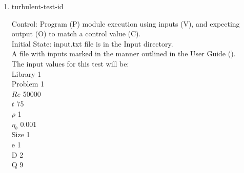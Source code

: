 \documentclass[12pt, titlepage]{article}
\newcommand{\famname}{Lattice Boltzmann Solver}
\newcounter{testcounter} %
\begin{document}
\begin{enumerate}
Test Case Derivation: This case is a comparison with the pseudo-oracle
pyLBM. The C values of this test for pyLBM can be found in the file
id5output.txt located in the OracleOutput folder. The output values of {\famname} will be compared to the pseudo-oracle output values.\\

This test covers a very small Reynolds number representing laminar flow.\\

How test will be performed: 

\begin{enumerate}
\item The Von Karman Vortex Street module shall be modified by the author to
  print the vorticity vector as output.
\item Outside of the system, the input parameter values will be written to a text file titled input.txt, as outlined in Section \ref{ext4-inputs} of the User Guide.
\item The file will be placed into the Input directory, under the home directory
  of the project.
\item {\famname} shall be run.  
\item Upon completion of the module, the output values of the vorticity vector
  will be compared to the vorticity vector values from pyLBM - comparison will
  be done per cell. Comparisons can be done manually using Excel, or through a
  script, using the equation for relative error found in Section \ref{eqerror}.
\end{enumerate}

\item{turbulent-test-id\thetestcounter \\}

Control: Program (P) module execution using inputs (V), and expecting output (O)
to match a control value (C).\\
					
Initial State: input.txt file is in the Input directory.\\
					
A file with inputs marked in the manner outlined in the User
Guide (\citet{LBM_UserGuide_PM}).\\The input values for this test will be:\\
Library 1\\
Problem 1\\
$Re$ 50000\\
$t$ 75\\
$\rho$ 1\\
$\eta_b$ 0.001\\
Size 1\\
$\mathrm{e}$ 1\\
$\mathrm{D}$ 2\\
$\mathrm{Q}$ 9\\


\end{enumerate}
\end{document}
